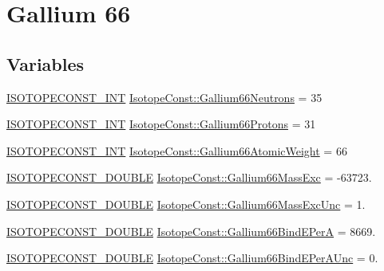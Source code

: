 \hypertarget{group___isotope_const-_gallium-_ga66}{}\section{Gallium 66}
\label{group___isotope_const-_gallium-_ga66}
\subsection*{Variables}
\begin{DoxyCompactItemize}
\item 
\mbox{\hyperlink{group___isotope_const-_macros_ga5f18360b3e99483a35c32d789e62621c}{I\+S\+O\+T\+O\+P\+E\+C\+O\+N\+S\+T\+\_\+\+I\+NT}} \mbox{\hyperlink{group___isotope_const-_gallium-_ga66_ga7d4ab4f72120614ca285c051835467df}{Isotope\+Const\+::\+Gallium66\+Neutrons}} = 35
\item 
\mbox{\hyperlink{group___isotope_const-_macros_ga5f18360b3e99483a35c32d789e62621c}{I\+S\+O\+T\+O\+P\+E\+C\+O\+N\+S\+T\+\_\+\+I\+NT}} \mbox{\hyperlink{group___isotope_const-_gallium-_ga66_ga8de690ce8c5faf7b8a38cd45e13ccaf0}{Isotope\+Const\+::\+Gallium66\+Protons}} = 31
\item 
\mbox{\hyperlink{group___isotope_const-_macros_ga5f18360b3e99483a35c32d789e62621c}{I\+S\+O\+T\+O\+P\+E\+C\+O\+N\+S\+T\+\_\+\+I\+NT}} \mbox{\hyperlink{group___isotope_const-_gallium-_ga66_gaafdd4c5efa23ffe99439d38614dbd574}{Isotope\+Const\+::\+Gallium66\+Atomic\+Weight}} = 66
\item 
\mbox{\hyperlink{group___isotope_const-_macros_ga8f45a7272ce02c0b4c65c44636ed719a}{I\+S\+O\+T\+O\+P\+E\+C\+O\+N\+S\+T\+\_\+\+D\+O\+U\+B\+LE}} \mbox{\hyperlink{group___isotope_const-_gallium-_ga66_ga013c81f80d3355e8045f96685488db0c}{Isotope\+Const\+::\+Gallium66\+Mass\+Exc}} = -\/63723.
\item 
\mbox{\hyperlink{group___isotope_const-_macros_ga8f45a7272ce02c0b4c65c44636ed719a}{I\+S\+O\+T\+O\+P\+E\+C\+O\+N\+S\+T\+\_\+\+D\+O\+U\+B\+LE}} \mbox{\hyperlink{group___isotope_const-_gallium-_ga66_ga821f06c32d2e48a40b0b61fb01510044}{Isotope\+Const\+::\+Gallium66\+Mass\+Exc\+Unc}} = 1.
\item 
\mbox{\hyperlink{group___isotope_const-_macros_ga8f45a7272ce02c0b4c65c44636ed719a}{I\+S\+O\+T\+O\+P\+E\+C\+O\+N\+S\+T\+\_\+\+D\+O\+U\+B\+LE}} \mbox{\hyperlink{group___isotope_const-_gallium-_ga66_gadc5544198b4cacec288851dfa9e181bf}{Isotope\+Const\+::\+Gallium66\+Bind\+E\+PerA}} = 8669.
\item 
\mbox{\hyperlink{group___isotope_const-_macros_ga8f45a7272ce02c0b4c65c44636ed719a}{I\+S\+O\+T\+O\+P\+E\+C\+O\+N\+S\+T\+\_\+\+D\+O\+U\+B\+LE}} \mbox{\hyperlink{group___isotope_const-_gallium-_ga66_gaff7aa789532d6bfd7b790e1e37764369}{Isotope\+Const\+::\+Gallium66\+Bind\+E\+Per\+A\+Unc}} = 0.

\end{DoxyCompactItemize}
